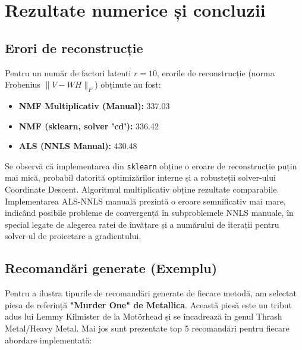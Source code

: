 \documentclass[12pt,a4paper]{article}
\begin{document}
\section{Rezultate numerice și concluzii}

\subsection{Erori de reconstrucție}
Pentru un număr de factori latenti $r=10$, erorile de reconstrucție (norma Frobenius $\|V - WH\|_F$) obținute au fost:
\begin{itemize}
\item \textbf{NMF Multiplicativ (Manual):} 337.03
\item \textbf{NMF (sklearn, solver 'cd'):} 336.42
\item \textbf{ALS (NNLS Manual):} 430.48
\end{itemize}
Se observă că implementarea din \texttt{sklearn} obține o eroare de reconstrucție puțin mai mică, probabil datorită optimizărilor interne și a robusteții solver-ului Coordinate Descent. Algoritmul multiplicativ obține rezultate comparabile. Implementarea ALS-NNLS manuală prezintă o eroare semnificativ mai mare, indicând posibile probleme de convergență în subproblemele NNLS manuale, în special legate de alegerea ratei de învățare și a numărului de iterații pentru solver-ul de proiectare a gradientului.

\subsection{Recomandări generate (Exemplu)}
\label{subsec:recomandari_exemplu}

Pentru a ilustra tipurile de recomandări generate de fiecare metodă, am selectat piesa de referință \textbf{"Murder One" de Metallica}. Această piesă este un tribut adus lui Lemmy Kilmister de la Motörhead și se încadrează în genul Thrash Metal/Heavy Metal. Mai jos sunt prezentate top 5 recomandări pentru fiecare abordare implementată:
\end{document}
